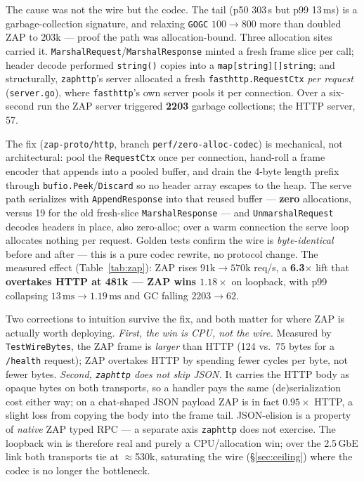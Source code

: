 \documentclass[11pt,twocolumn]{article}
\begin{document}
The cause was not the wire but the codec. The tail (p50 303\,\textmu s but p99
13\,ms) is a garbage-collection signature, and relaxing \texttt{GOGC} $100\to800$
more than doubled ZAP to 203k --- proof the path was allocation-bound. Three
allocation sites carried it. \texttt{MarshalRequest}/\texttt{MarshalResponse}
minted a fresh frame slice per call; header decode performed \texttt{string()}
copies into a \texttt{map[string][]string}; and structurally, \texttt{zaphttp}'s
server allocated a fresh \texttt{fasthttp.RequestCtx} \emph{per request}
(\texttt{server.go}), where \texttt{fasthttp}'s own server pools it per
connection. Over a six-second run the ZAP server triggered \textbf{2203}
garbage collections; the HTTP server, 57.

The fix (\texttt{zap-proto/http}, branch \texttt{perf/zero-alloc-codec}) is
mechanical, not architectural: pool the \texttt{RequestCtx} once per connection,
hand-roll a frame encoder that appends into a pooled buffer, and drain the
4-byte length prefix through \texttt{bufio.Peek}/\texttt{Discard} so no header
array escapes to the heap. The serve path serializes with
\texttt{AppendResponse} into that reused buffer --- \textbf{zero} allocations,
versus 19 for the old fresh-slice \texttt{MarshalResponse} --- and
\texttt{UnmarshalRequest} decodes headers in place, also zero-alloc; over a warm
connection the serve loop allocates nothing per request. Golden tests confirm the
wire is
\emph{byte-identical} before and after --- this is a pure codec rewrite, no
protocol change. The measured effect (Table~\ref{tab:zap}): ZAP rises
$91\text{k}\to570\text{k}$ req/s, a \textbf{6.3$\times$} lift that
\textbf{overtakes HTTP at 481k --- ZAP wins $1.18\times$} on loopback, with p99
collapsing $13\,\text{ms}\to1.19\,\text{ms}$ and GC falling $2203\to62$.

Two corrections to intuition survive the fix, and both matter for where ZAP is
actually worth deploying. \emph{First, the win is CPU, not the wire.} Measured by
\texttt{TestWireBytes}, the ZAP frame is \emph{larger} than HTTP (124 vs.\ 75
bytes for a \texttt{/health} request); ZAP overtakes HTTP by spending fewer
cycles per byte, not fewer bytes. \emph{Second, \texttt{zaphttp} does not skip
JSON.} It carries the HTTP body as opaque bytes on both transports, so a handler
pays the same (de)serialization cost either way; on a chat-shaped JSON payload
ZAP is in fact $0.95\times$ HTTP, a slight loss from copying the body into the
frame tail. JSON-elision is a property of \emph{native} ZAP typed RPC --- a
separate axis \texttt{zaphttp} does not exercise. The loopback win is therefore
real and purely a CPU/allocation win; over the 2.5\,GbE link both transports tie
at $\approx$530k, saturating the wire (\S\ref{sec:ceiling}) where the codec is no
longer the bottleneck.
\end{document}

